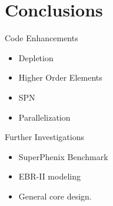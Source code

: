\section{Conclusions}
\label{sec:conclusions}

\begin{frame}{Code Enhancements}
  \begin{itemize}
    \item Depletion
    \item Higher Order Elements
    \item SPN
    \item Parallelization
  \end{itemize}
\end{frame}

\begin{frame}{Further Investigations}
  \begin{itemize}
    \item SuperPhenix Benchmark
    \item EBR-II modeling
    \item General core design.
  \end{itemize}
\end{frame}
